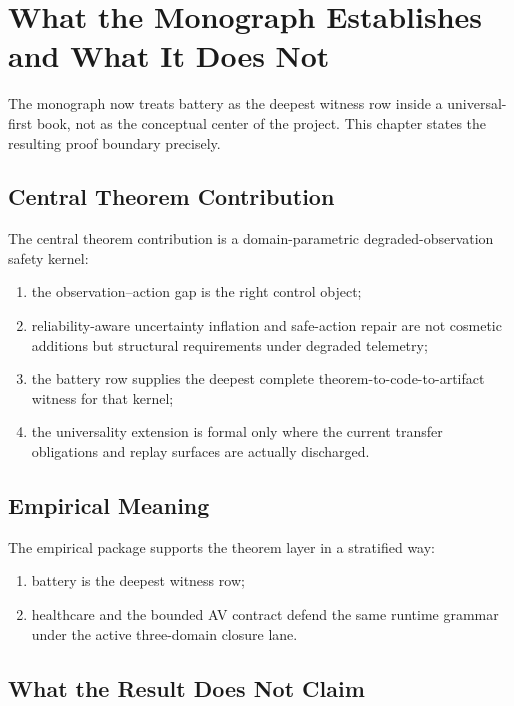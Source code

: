 \chapter{What the Monograph Establishes and What It Does Not}
\label{ch:what-battery-thesis-proves}

The monograph now treats battery as the deepest witness row inside a
universal-first book, not as the conceptual center of the project. This
chapter states the resulting proof boundary precisely.

\section{Central Theorem Contribution}

The central theorem contribution is a domain-parametric degraded-observation
safety kernel:

\begin{enumerate}
  \item the observation--action gap is the right control object;
  \item reliability-aware uncertainty inflation and safe-action repair are not
    cosmetic additions but structural requirements under degraded telemetry;
  \item the battery row supplies the deepest complete theorem-to-code-to-artifact
    witness for that kernel;
  \item the universality extension is formal only where the current transfer
    obligations and replay surfaces are actually discharged.
\end{enumerate}

\section{Empirical Meaning}

The empirical package supports the theorem layer in a stratified way:

\begin{enumerate}
  \item battery is the deepest witness row;
  \item healthcare and the bounded AV contract defend the same runtime grammar
    under the active three-domain closure lane.
\end{enumerate}

\section{What the Result Does Not Claim}

